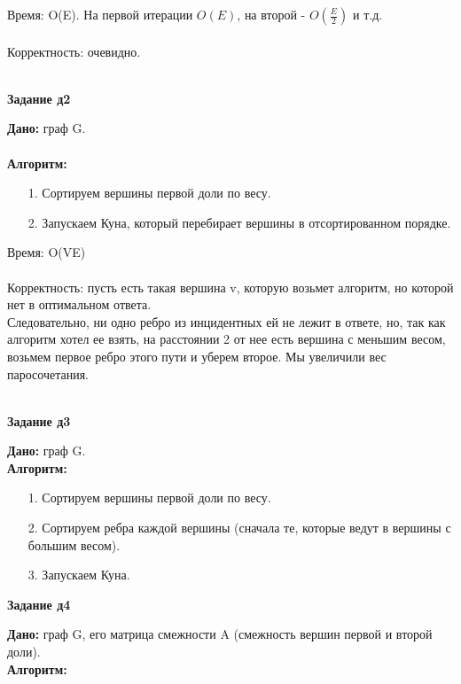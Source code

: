 \documentclass[12pt]{article} %
\begin{document}
	Время: O(E). На первой итерации $O(E)$, на второй - $O(\frac{E}{2})$ и т.д.\\
	\\
	Корректность: очевидно.\\
	\\
	\begin{center}
		\textbf{Задание д2}\\
	\end{center}
	\textbf{Дано:} граф G.\\
	\\
	\textbf{Алгоритм:}\\
	\begin{enumerate}
		\item[1.] Сортируем вершины первой доли по весу.
		\item[2.] Запускаем Куна, который перебирает вершины в отсортированном порядке.
	\end{enumerate}
	Время: O(VE)\\
	\\
	Корректность: пусть есть такая вершина v, которую возьмет алгоритм, но которой нет в оптимальном ответа.\\
				  Следовательно, ни одно ребро из инцидентных ей не лежит в ответе, но, так как алгоритм хотел ее взять,
				  на расстоянии 2 от нее есть вершина с меньшим весом, возьмем первое ребро этого пути и уберем второе.
				  Мы увеличили вес паросочетания.\\
	\\
	\begin{center}
		\textbf{Задание д3}\\
	\end{center}
	\textbf{Дано:} граф G.\\
	\textbf{Алгоритм:}\\
	\begin{enumerate}
		\item[1.] Сортируем вершины первой доли по весу.
		\item[2.] Сортируем ребра каждой вершины (сначала те, которые ведут в вершины с большим весом).
		\item[3.] Запускаем Куна.
	\end{enumerate}
	\begin{center}
		\textbf{Задание д4}\\
	\end{center}
	\textbf{Дано:} граф G, его матрица смежности A (смежность вершин первой и второй доли).\\
	\textbf{Алгоритм:}\\
\end{document}
